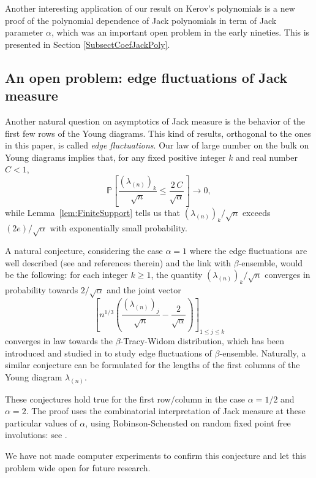 \documentclass[11pt]{amsart}
\theoremstyle{plain}
\theoremstyle{remark}
\newcommand{\PP}{\mathbb{P}}
\begin{document}
Another interesting application of our result on Kerov's polynomials is
a new proof of the polynomial dependence of Jack polynomials in
term of Jack parameter $\alpha$, which was an important open problem
in the early nineties.
This is presented in Section \ref{SubsectCoefJackPoly}.

\subsection{An open problem: edge fluctuations of Jack measure}
Another natural question on asymptotics of Jack measure is the behavior
of the first few rows of the Young diagrams.
This kind of results, orthogonal to the ones in this paper,
is called {\em edge fluctuations}.
Our law of large number on the bulk on Young diagrams implies
that, for any fixed positive integer $k$ and real number $C<1$,
\[\PP \left[ \frac{(\lambda_{(n)})_k}{\sqrt{n}} \leq \frac{2\, C}{\sqrt{\alpha}} \right] \to 0,\]
while Lemma~\ref{lem:FiniteSupport} tells us that $(\lambda_{(n)})_k/\sqrt{n}$
exceeds $(2e)/\sqrt{\alpha}$ with exponentially small probability.

A natural conjecture, considering the case $\alpha=1$ where the edge fluctuations
are well described (see \cite{Okounkov2000,BorodinOkounkovOlshanski2000} and references therein)
and the link with $\beta$-ensemble, would be the following:
for each integer $k \ge 1$, the quantity $(\lambda_{(n)})_k/\sqrt{n}$ converges in
probability towards $2/\sqrt{\alpha}$ and the joint vector 
\[ \left[ n^{1/3} \left( \frac{(\lambda_{(n)})_j}{\sqrt{n}} - \frac{2}{\sqrt{\alpha}} \right) \right]_{1 \le j \le k}\]
converges in law towards the $\beta$-Tracy-Widom distribution,
which has been introduced and studied in \cite{BetaEdgeFluctuations} to study
edge fluctuations of $\beta$-ensemble.
Naturally, a similar conjecture can be formulated for the lengths of the first columns of
the Young diagram $\lambda_{(n)}$.

These conjectures hold true for the first row/column in the case $\alpha=1/2$ and $\alpha=2$.
The proof uses the combinatorial interpretation of Jack measure at these particular values of $\alpha$,
using Robinson-Schensted on random fixed point free involutions:
see \cite{BaikRainsMonotomeSubsequenceInvolutions}.

We have not made computer experiments to confirm this conjecture
and let this problem wide open for future research.
\end{document}
